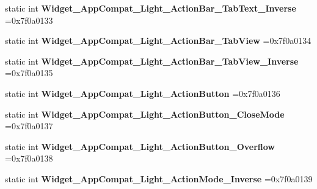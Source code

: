 \begin{DoxyCompactItemize}
\item 
\mbox{\label{classandroid_1_1support_1_1graphics_1_1drawable_1_1R_1_1style_a0aa5d74ff4552752541551a4793925d6}} 
static int {\bfseries Widget\+\_\+\+App\+Compat\+\_\+\+Light\+\_\+\+Action\+Bar\+\_\+\+Tab\+Text\+\_\+\+Inverse} =0x7f0a0133
\item 
\mbox{\label{classandroid_1_1support_1_1graphics_1_1drawable_1_1R_1_1style_aa91a2f8a5e7e50ec1f3adbf40b82c12a}} 
static int {\bfseries Widget\+\_\+\+App\+Compat\+\_\+\+Light\+\_\+\+Action\+Bar\+\_\+\+Tab\+View} =0x7f0a0134
\item 
\mbox{\label{classandroid_1_1support_1_1graphics_1_1drawable_1_1R_1_1style_a748c1273b6d418b430727fac686b0068}} 
static int {\bfseries Widget\+\_\+\+App\+Compat\+\_\+\+Light\+\_\+\+Action\+Bar\+\_\+\+Tab\+View\+\_\+\+Inverse} =0x7f0a0135
\item 
\mbox{\label{classandroid_1_1support_1_1graphics_1_1drawable_1_1R_1_1style_a7904a7b074138aa40600c89c6b2f468d}} 
static int {\bfseries Widget\+\_\+\+App\+Compat\+\_\+\+Light\+\_\+\+Action\+Button} =0x7f0a0136
\item 
\mbox{\label{classandroid_1_1support_1_1graphics_1_1drawable_1_1R_1_1style_a19473d78438b5256537456418518b7cf}} 
static int {\bfseries Widget\+\_\+\+App\+Compat\+\_\+\+Light\+\_\+\+Action\+Button\+\_\+\+Close\+Mode} =0x7f0a0137
\item 
\mbox{\label{classandroid_1_1support_1_1graphics_1_1drawable_1_1R_1_1style_ae487a8e6909e4fe026e358c9c66b3266}} 
static int {\bfseries Widget\+\_\+\+App\+Compat\+\_\+\+Light\+\_\+\+Action\+Button\+\_\+\+Overflow} =0x7f0a0138
\item 
\mbox{\label{classandroid_1_1support_1_1graphics_1_1drawable_1_1R_1_1style_ab6a91be55d65aae49060cbb897d4dc22}} 
static int {\bfseries Widget\+\_\+\+App\+Compat\+\_\+\+Light\+\_\+\+Action\+Mode\+\_\+\+Inverse} =0x7f0a0139

\end{DoxyCompactItemize}
